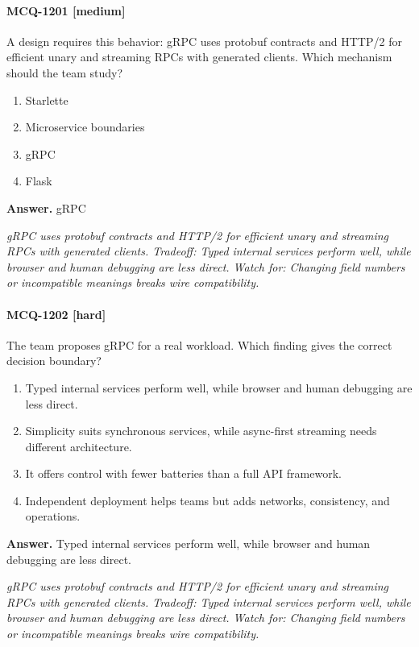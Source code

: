\paragraph{MCQ-1201 [medium]} A design requires this behavior: gRPC uses protobuf contracts and HTTP/2 for efficient unary and streaming RPCs with generated clients. Which mechanism should the team study?
\begin{enumerate}[label=\Alph*.]
\item Starlette
\item Microservice boundaries
\item gRPC
\item Flask
\end{enumerate}
\noindent\textbf{Answer.} gRPC
\par\textit{gRPC uses protobuf contracts and HTTP/2 for efficient unary and streaming RPCs with generated clients. Tradeoff: Typed internal services perform well, while browser and human debugging are less direct. Watch for: Changing field numbers or incompatible meanings breaks wire compatibility.}
\paragraph{MCQ-1202 [hard]} The team proposes gRPC for a real workload. Which finding gives the correct decision boundary?
\begin{enumerate}[label=\Alph*.]
\item Typed internal services perform well, while browser and human debugging are less direct.
\item Simplicity suits synchronous services, while async-first streaming needs different architecture.
\item It offers control with fewer batteries than a full API framework.
\item Independent deployment helps teams but adds networks, consistency, and operations.
\end{enumerate}
\noindent\textbf{Answer.} Typed internal services perform well, while browser and human debugging are less direct.
\par\textit{gRPC uses protobuf contracts and HTTP/2 for efficient unary and streaming RPCs with generated clients. Tradeoff: Typed internal services perform well, while browser and human debugging are less direct. Watch for: Changing field numbers or incompatible meanings breaks wire compatibility.}
